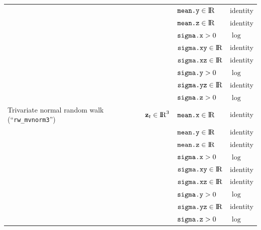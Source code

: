 \documentclass[12pt]{article}\usepackage[]{graphicx}\usepackage[]{xcolor}
\begin{document}
\begin{small}
\begin{table}
\begin{tabular}{llll}
  \rowcolor{Gray}                                       &                                 & $\verb|mean.y|\in{\rm I\!R}$     &  identity \tabularnewline  
  \rowcolor{Gray}                                       &                                 & $\verb|mean.z|\in{\rm I\!R}$     &  identity \tabularnewline  
  \rowcolor{Gray}                                       &                                 & $\verb|sigma.x|>0$               &  $\log$ \tabularnewline                                                
  \rowcolor{Gray}                                       &                                 & $\verb|sigma.xy|\in{\rm I\!R}$   &  identity \tabularnewline
  \rowcolor{Gray}                                       &                                 & $\verb|sigma.xz|\in{\rm I\!R}$   &  identity \tabularnewline          
  \rowcolor{Gray}                                       &                                 & $\verb|sigma.y|>0$               &  $\log$ \tabularnewline   
  \rowcolor{Gray}                                       &                                 & $\verb|sigma.yz|\in{\rm I\!R}$   &  identity \tabularnewline  
  \rowcolor{Gray}                                       &                                 & $\verb|sigma.z|>0$               &  $\log$ \tabularnewline
  Trivariate normal random walk (``\verb|rw_mvnorm3|'') & ${\mathbf z_t}\in{\rm I\!R}^3$  & $\verb|mean.x|\in{\rm I\!R}$     &  identity \tabularnewline  
                                                        &                                 & $\verb|mean.y|\in{\rm I\!R}$     &  identity \tabularnewline  
                                                        &                                 & $\verb|mean.z|\in{\rm I\!R}$     &  identity \tabularnewline  
                                                        &                                 & $\verb|sigma.x|>0$               &  $\log$ \tabularnewline                                                                                                                      &                                 & $\verb|sigma.xy|\in{\rm I\!R}$   &  identity \tabularnewline    
                                                        &                                 & $\verb|sigma.xz|\in{\rm I\!R}$   &  identity \tabularnewline 
                                                        &                                 & $\verb|sigma.y|>0$               &  $\log$ \tabularnewline   
                                                        &                                 & $\verb|sigma.yz|\in{\rm I\!R}$   &  identity \tabularnewline  
                                                        &                                 & $\verb|sigma.z|>0$               &  $\log$ \tabularnewline  

\end{tabular}
\end{table}
\end{small}
\end{document}
